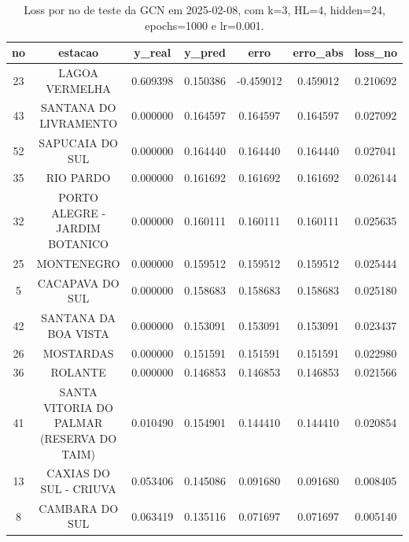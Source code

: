 \begin{table}[h]
\centering
\caption{Loss por no de teste da GCN em 2025-02-08, com k=3, HL=4, hidden=24, epochs=1000 e lr=0.001.}
\label{tab:gcn_loss_k3_hl4_h24_e1000_d20250208}
\begin{tabular}{ccccccc}
\toprule
no & estacao & y\_real & y\_pred & erro & erro\_abs & loss\_no \\
\midrule
23 & LAGOA VERMELHA & 0.609398 & 0.150386 & -0.459012 & 0.459012 & 0.210692 \\
43 & SANTANA DO LIVRAMENTO & 0.000000 & 0.164597 & 0.164597 & 0.164597 & 0.027092 \\
52 & SAPUCAIA DO SUL & 0.000000 & 0.164440 & 0.164440 & 0.164440 & 0.027041 \\
35 & RIO PARDO & 0.000000 & 0.161692 & 0.161692 & 0.161692 & 0.026144 \\
32 & PORTO ALEGRE - JARDIM BOTANICO & 0.000000 & 0.160111 & 0.160111 & 0.160111 & 0.025635 \\
25 & MONTENEGRO & 0.000000 & 0.159512 & 0.159512 & 0.159512 & 0.025444 \\
5 & CACAPAVA DO SUL & 0.000000 & 0.158683 & 0.158683 & 0.158683 & 0.025180 \\
42 & SANTANA DA BOA VISTA & 0.000000 & 0.153091 & 0.153091 & 0.153091 & 0.023437 \\
26 & MOSTARDAS & 0.000000 & 0.151591 & 0.151591 & 0.151591 & 0.022980 \\
36 & ROLANTE & 0.000000 & 0.146853 & 0.146853 & 0.146853 & 0.021566 \\
41 & SANTA VITORIA DO PALMAR (RESERVA DO TAIM) & 0.010490 & 0.154901 & 0.144410 & 0.144410 & 0.020854 \\
13 & CAXIAS DO SUL - CRIUVA & 0.053406 & 0.145086 & 0.091680 & 0.091680 & 0.008405 \\
8 & CAMBARA DO SUL & 0.063419 & 0.135116 & 0.071697 & 0.071697 & 0.005140 \\
\bottomrule
\end{tabular}
\end{table}
